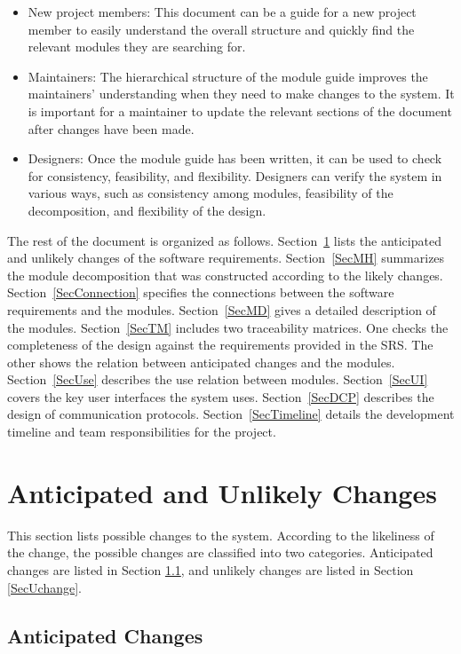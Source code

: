 \documentclass[12pt, titlepage]{article}
\begin{document}
\begin{itemize}
\item New project members: This document can be a guide for a new project member
  to easily understand the overall structure and quickly find the
  relevant modules they are searching for.
\item Maintainers: The hierarchical structure of the module guide improves the
  maintainers' understanding when they need to make changes to the system. It is
  important for a maintainer to update the relevant sections of the document
  after changes have been made.
\item Designers: Once the module guide has been written, it can be used to
  check for consistency, feasibility, and flexibility. Designers can verify the
  system in various ways, such as consistency among modules, feasibility of the
  decomposition, and flexibility of the design.
\end{itemize}

The rest of the document is organized as follows. Section~\ref{SecChange} lists
the anticipated and unlikely changes of the software
requirements. Section~\ref{SecMH} summarizes the module decomposition that
was constructed according to the likely changes. Section~\ref{SecConnection}
specifies the connections between the software requirements and the
modules. Section~\ref{SecMD} gives a detailed description of the
modules. Section~\ref{SecTM} includes two traceability matrices. One checks
the completeness of the design against the requirements provided in the SRS. The
other shows the relation between anticipated changes and the modules.
Section~\ref{SecUse} describes the use relation between modules. Section~\ref{SecUI}
covers the key user interfaces the system uses. Section~\ref{SecDCP}
describes the design of communication protocols. Section~\ref{SecTimeline}
details the development timeline and team responsibilities for the project.

\section{Anticipated and Unlikely Changes} \label{SecChange}

This section lists possible changes to the system. According to the likeliness
of the change, the possible changes are classified into two
categories. Anticipated changes are listed in Section \ref{SecAchange}, and
unlikely changes are listed in Section \ref{SecUchange}.

\subsection{Anticipated Changes} \label{SecAchange}
\end{document}
